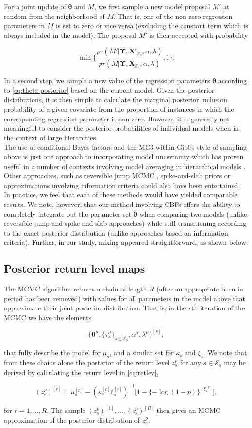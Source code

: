 \documentclass[11pt,english]{article}
\newcommand{\bs}[1]{\boldsymbol{#1}}
\newcommand{\mc}[1]{\mathcal{#1}}
\newcommand{\bl}{\begin{linenomath}}
\newcommand{\el}{\end{linenomath}}
\begin{document}
For a joint update of $\bs{\theta}$ and $M$, we first sample a new model proposal $M'$ at random from the neighborhood of $M$. That is, one of the non-zero regression parameters in $M$ is set to zero or vice versa (excluding the constant term which is always included in the model).  The proposal $M'$ is then accepted with probability 
\bl\[
\min \Big\{ \frac{pr(M'|\bs{\Upsilon}, \bs{X}'_{\mc{S}_o}, \alpha, \lambda )}{pr(M|\bs{\Upsilon}, \bs{X}_{\mc{S}_o}, \alpha, \lambda )}, 1\Big\}.  
\]\el
In a second step, we sample a new value of the regression parameters  $\bs{\theta}$ according to \eqref{eq:theta posterior} based on the current model.  Given the posterior distributions, it is then simple to calculate the marginal posterior inclusion probability of a given covariate from the proportion of instances in which the corresponding regression parameter is non-zero.  However, it is generally not meaningful to consider the posterior probabilities of individual models when in the context of large hierarchies.\\
\indent The use of conditional Bayes factors and the MC3-within-Gibbs style of sampling above is just one approach to incorporating model uncertainty which has proven useful in a number of contexts involving model averaging in hierarchical models \citep[see][for related examples]{holmes_et_2002,karl_lenkoski_2011,cheng_lenkoski_2012}.  Other approaches, such as reversible jump MCMC \citep{green_1995}, spike-and-slab priors \citep{george_mcculloch_1993} or approximations involving information criteria \citep{raftery_1995} could also have been entertained.  In practice, we feel that each of these methods would have yielded comparable results.  We note, however, that our method involving CBFs offers the ability to completely integrate out the parameter set $\bs{\theta}$ when comparing two models (unlike reversible jump and spike-and-slab approaches) while still transitioning according to the exact posterior distribution (unlike approaches based on information criteria).  Further, in our study, mixing appeared straightforward, as shown below.

\subsection{Posterior return level maps}\label{sec:interpolation}

The MCMC algorithm returns a chain of length $R$ (after an appropriate burn-in period has been removed) with values for all parameters in the model above that approximate their joint posterior distribution. That is, in the $r$th iteration of the MCMC we have the elements
\bl\[
\big\{\bs{\theta}^\mu, \{\tau_s^{\mu}\}_{s\in\mc{S}_o}, \alpha^\mu, \lambda^{\mu}\big\}^{[r]},
\]\el
that fully describe the model for $\mu_s$, and a similar set for $\kappa_s$ and $\xi_s$.  We note that from these chains alone the posterior of the return level $z^p_s$ for any $s\in\mc{S}_o$ may be derived by calculating the return level in \eqref{eq:retlev},  
\bl\[
(z_s^p)^{[r]} = \mu_{s}^{[r]} -  (\kappa_s^{[r]} \xi_s^{[r]} )^{-1} \big[1 - \{ - \log(1 - p)\}^{-\xi_s^{[r]}}\big], 
\]\el
for $r = 1,\ldots,R$.  The sample $(z_s^p)^{[1]}, \dots, (z^p_s)^{[R]}$ then gives an MCMC approximation of the posterior distribution of $z^p_s$.
\end{document}

